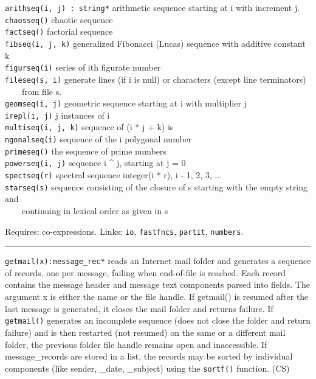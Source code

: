 \texttt{arithseq(i, j) : string*} arithmetic sequence starting at i with
increment j.\\
\texttt{chaosseq()} chaotic sequence\\
\texttt{factseq()} factorial sequence\\
\texttt{fibseq(i, j, k)} generalized Fibonacci (Lucas) sequence with
additive constant k\\
\texttt{figurseq(i)} series of i{\textquotesingle}th figurate
number\\
\texttt{fileseq(s, i)} generate lines (if i is null) or characters
(except line terminators)\\
 \ \ \ \ from file s.\\
\texttt{geomseq(i, j)} geometric sequence starting at i with multiplier
j\\
\texttt{irepl(i, j)} j instances of i\\
\texttt{multiseq(i, j, k)} sequence of (i * j + k)
i{\textquotesingle}s\\
\texttt{ngonalseq(i)} sequence of the i polygonal number\\
\texttt{primeseq()} the sequence of prime numbers\\
\texttt{powerseq(i, j)} sequence i \^{} j, starting at j = 0\\
\texttt{spectseq(r)} spectral sequence integer(i * r), i - 1, 2, 3,
...\\
\texttt{starseq(s)} sequence consisting of the closure of s starting
with the empty string and\\
 \ \ \ \ continuing in lexical order as given in s

Requires: co-expressions. Links: \texttt{io}, \texttt{fastfncs},
\texttt{partit}, \texttt{numbers}. 

\vspace{0.25cm}\hrule{}

\texttt{getmail(x):message\_rec*} reads an Internet mail folder and generates a sequence of records, one per message,
failing when end-of-file is reached. Each record contains the message
header and message text components parsed into fields. The argument x
is either the name or the file handle. If getmail() is resumed after
the last message is generated, it closes the mail folder and returns
failure. If \texttt{getmail()} generates an incomplete sequence (does
not close the folder and return failure) and is then restarted (not
resumed) on the same or a different mail folder, the previous folder
file handle remains open and inaccessible. If message\_records are
stored in a list, the records may be sorted by individual components
(like sender, \_date, \_subject) using the \texttt{sortf()} function.
(CS)

